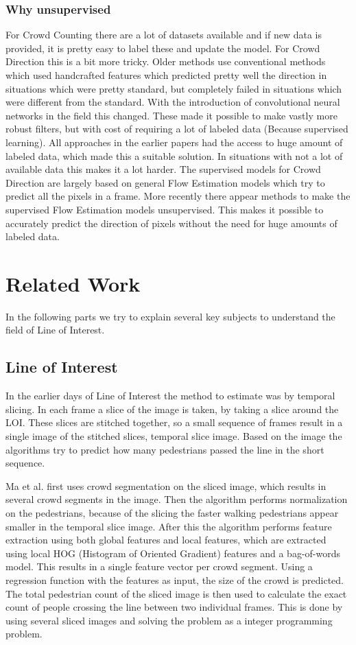 \documentclass{article}
\begin{document}
\subsubsection{Why unsupervised}
For Crowd Counting there are a lot of datasets available and if new data is provided, it is pretty easy to label these and update the model. For Crowd Direction this is a bit more tricky. Older methods use conventional methods which used handcrafted features which predicted pretty well the direction in situations which were pretty standard, but completely failed in situations which were different from the standard. With the introduction of convolutional neural networks in the field this changed. These made it possible to make vastly more robust filters, but with cost of requiring a lot of labeled data (Because supervised learning). All approaches in the earlier papers had the access to huge amount of labeled data, which made this a suitable solution. In situations with not a lot of available data this makes it a lot harder.
The supervised models for Crowd Direction are largely based on general Flow Estimation models which try to predict all the pixels in a frame. More recently there appear methods to make the supervised Flow Estimation models unsupervised. This makes it possible to accurately predict the direction of pixels without the need for huge amounts of labeled data.

\section{Related Work}
In the following parts we try to explain several key subjects to understand the field of Line of Interest.


\subsection{Line of Interest}
In the earlier days of Line of Interest the method to estimate was by temporal slicing. In each frame a slice of the image is taken, by taking a slice around the LOI. These slices are stitched together, so a small sequence of frames result in a single image of the stitched slices, temporal slice image. Based on the image the algorithms try to predict how many pedestrians passed the line in the short sequence.

Ma et al. \cite{ma_counting_2016} first uses crowd segmentation on the sliced image, which results in several crowd segments in the image. Then the algorithm performs normalization on the pedestrians, because of the slicing the faster walking pedestrians appear smaller in the temporal slice image. After this the algorithm performs feature extraction using both global features and local features, which are extracted using local HOG (Histogram of Oriented Gradient) features and a bag-of-words model. This results in a single feature vector per crowd segment. Using a regression function with the features as input, the size of the crowd is predicted. The total pedestrian count of the sliced image is then used to calculate the exact count of people crossing the line between two individual frames. This is done by using several sliced images and solving the problem as a integer programming problem.
\end{document}

